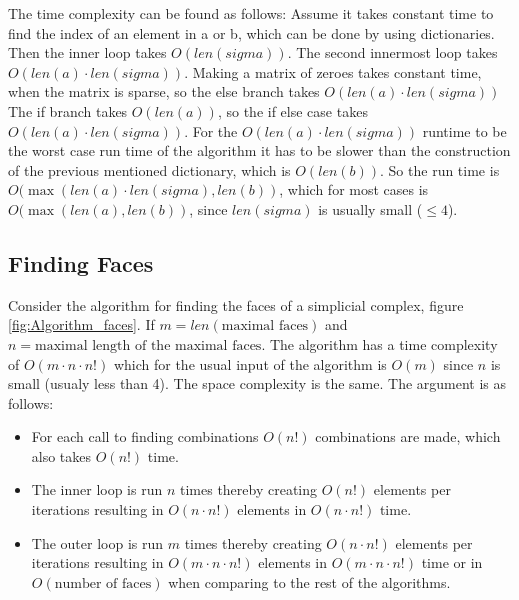 \documentclass[11pt,a4paper,twoside, openright]{report}
\begin{document}
The time complexity can be found as follows:
Assume it takes constant time to find the index of an element in a or b, which can be done by using dictionaries. Then the inner loop takes $O(len(sigma))$.
The second innermost loop takes $O(len(a)\cdot len(sigma))$.
Making a matrix of zeroes takes constant time, when the matrix is sparse, so the else branch takes $O(len(a)\cdot len(sigma))$
The if branch takes $O(len(a))$, so the if else case takes $O(len(a)\cdot len(sigma))$. 
For the $O(len(a)\cdot len(sigma))$ runtime to be the worst case run time of the algorithm it has to be slower than the construction of the previous mentioned dictionary, which is $O(len(b))$.
So the run time is $O(\max(len(a)\cdot len(sigma),len(b))$, which for most cases is $O(\max(len(a),len(b))$, since $len(sigma)$ is usually small ($\leq 4$).
 

\subsection{Finding Faces}
Consider the algorithm for finding the faces of a simplicial complex, figure \ref{fig:Algorithm_faces}. If $m = len(\text{maximal faces})$ and $n = \text{maximal length of the maximal faces}$. The algorithm has a time complexity of $O(m\cdot n\cdot n!)$ which for the usual input of the algorithm is $O(m)$ since $n$ is small (usualy less than 4). The space complexity is the same. The argument is as follows:
\begin{itemize}
\item For each call to finding combinations $O(n!)$ combinations are made, which also takes $O(n!)$ time.
\item The inner loop is run $n$ times thereby creating $O(n!)$ elements per iterations resulting in $O(n\cdot n!)$ elements in $O(n\cdot n!)$ time.
\item The outer loop is run $m$ times thereby creating $O(n\cdot n!)$ elements per iterations resulting in $O(m\cdot n\cdot n!)$ elements in $O(m\cdot n\cdot n!)$ time or in $O(\text{number of faces})$ when comparing to the rest of the algorithms.
\end{itemize}
\end{document}
